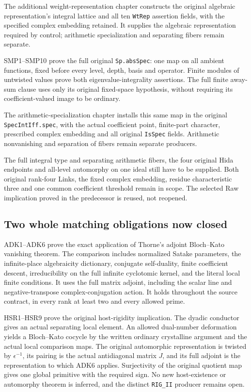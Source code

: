 \documentclass[11pt,a4paper]{article}
\numberwithin{equation}{section}
\theoremstyle{remark}\newtheorem{remark}[theorem]{Remark}
\begin{document}
The additional weight-representation chapter constructs the original algebraic representation's integral lattice and all ten \texttt{Wt\allowbreak Rep} assertion fields, with the specified complex embedding retained. It supplies the algebraic representation required by control; arithmetic specialization and separating fibers remain separate.\par SMP1--SMP10 prove the full original \texttt{Sp.\allowbreak abs\allowbreak Spec}: one map on all ambient functions, fixed before every level, depth, basis and operator. Finite modules of untwisted values prove both eigenvalue-integrality assertions. The full finite away-sum clause uses only its original fixed-space hypothesis, without requiring its coefficient-valued image to be ordinary.\par The arithmetic-specialization chapter installs this same map in the original \texttt{Spec\allowbreak Int\allowbreak Iff.\allowbreak spec}, with the actual coefficient point, finite-part character, prescribed complex embedding and all original \texttt{Is\allowbreak Spec} fields. Arithmetic nonvanishing and separation of fibers remain separate producers.

The full integral type and separating arithmetic fibers,
the four original Hida endpoints and all-level automorphy on one ideal
still have to be supplied. Both original rank-four Links, the fixed
complex embedding, residue characteristic three and one common
coefficient threshold remain in scope. The selected Raw implication
proved in the predecessor is reused, not reopened.

\subsection{Two whole matching obligations now closed}

ADK1--ADK6 prove the exact application of Thorne's adjoint
Bloch--Kato vanishing theorem. The comparison includes normalized
Satake parameters, the infinite-place algebraicity dictionary,
conjugate self-duality, finite coefficient descent, irreducibility on
the full infinite cyclotomic kernel, and the literal local finite
conditions. It uses the full matrix adjoint, including the scalar line
and negative-transpose complex-conjugation action. It holds throughout
the source contract, in every rank at least two and every allowed prime.

HSR1--HSR9 prove the original host-rigidity implication. The dyadic
conductor gives an actual separating local element. An allowed
dual-number deformation yields a Bloch--Kato cocycle by the written
ordinary crystalline argument and the actual local comparison maps.
The original automorphic representation is twisted by
$\epsilon^{-1}$, its pairing is the actual antidiagonal matrix $J$,
and its full adjoint is the representation to which ADK6 applies.
Surjectivity of the original quotient map gives one global primitive
with the required sign. No new host-existence or automorphy theorem is
inferred, and the distinct \texttt{RIG\_\allowbreak II} producer remains open.
\end{document}
